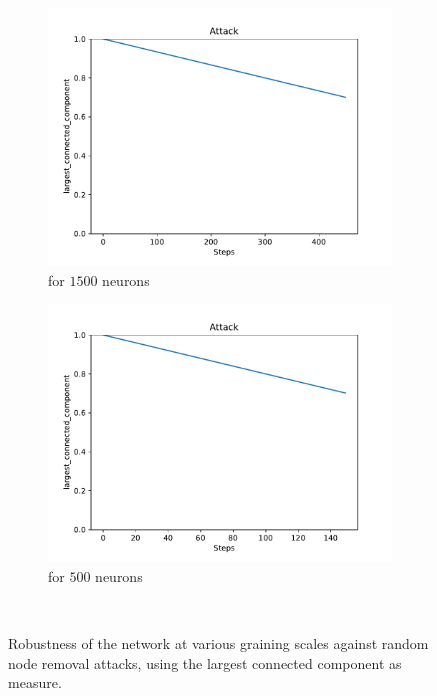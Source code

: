 \begin{figure}
\begin{subfigure}[b]{0.45\textwidth}
		\includegraphics[width=\textwidth]{Images/plots_rnd/rnd_38.pdf}
		\caption{for $1500$ neurons}
	\end{subfigure}
	\hfill
	\begin{subfigure}[b]{0.45\textwidth}
		\centering
		\includegraphics[width=\textwidth]{Images/plots_rnd/rnd_40.pdf}
		\caption{for $500$ neurons}
	\end{subfigure}
	\\ \vspace{5mm}
	

	\caption{Robustness of the network at various graining scales against random node removal attacks, using the largest connected component as measure.}
	\label{fig:rnd_atk}
\end{figure}


